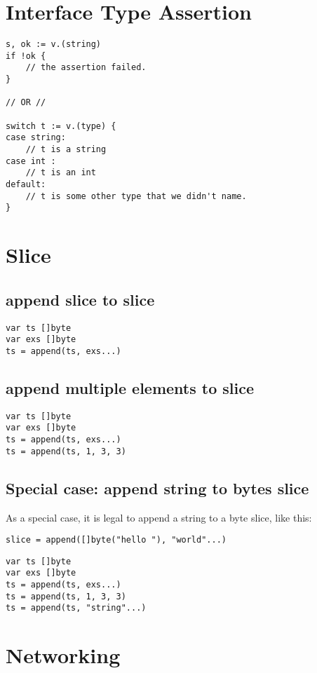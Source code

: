 \documentclass[]{article}
\begin{document}
\section{Interface Type Assertion}
\begin{lstlisting}
s, ok := v.(string)
if !ok {
	// the assertion failed.
}

// OR //

switch t := v.(type) {
case string:
	// t is a string
case int :
	// t is an int
default:
	// t is some other type that we didn't name.
}
\end{lstlisting}

\section{Slice}
\subsection{append slice to slice}
\begin{lstlisting}
var ts []byte
var exs []byte
ts = append(ts, exs...)
\end{lstlisting}

\subsection{append multiple elements to slice}
\begin{lstlisting}
var ts []byte
var exs []byte
ts = append(ts, exs...)
ts = append(ts, 1, 3, 3)
\end{lstlisting}

\subsection{Special case: append string to bytes slice}
As a special case, it is legal to append a string to a byte slice, like this:
\begin{lstlisting}
slice = append([]byte("hello "), "world"...)
\end{lstlisting}
\begin{lstlisting}
var ts []byte
var exs []byte
ts = append(ts, exs...)
ts = append(ts, 1, 3, 3)
ts = append(ts, "string"...)
\end{lstlisting}
\section{Networking}
\end{document}
